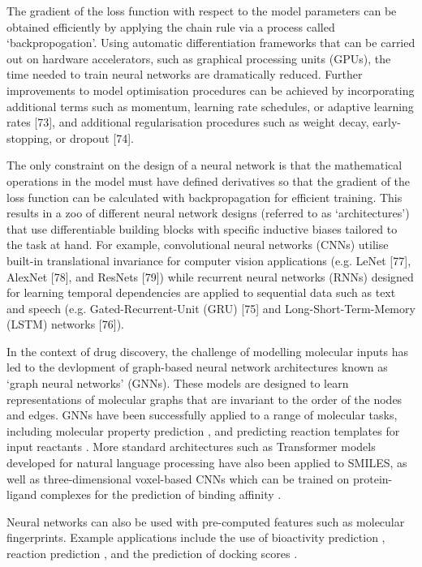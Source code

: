 The gradient of the loss function with respect to the model parameters can be obtained efficiently by applying the chain rule via a process called `backpropogation'. Using automatic differentiation frameworks that can be carried out on hardware accelerators, such as graphical processing units (GPUs), the time needed to train neural networks are dramatically reduced. Further improvements to model optimisation procedures can be achieved by incorporating additional terms such as momentum, learning rate schedules, or adaptive learning rates [73], and additional regularisation procedures such as weight decay, early-stopping, or dropout [74].

The only constraint on the design of a neural network is that the mathematical operations in the model must have defined derivatives so that the gradient of the loss function can be calculated with backpropagation for efficient training. This results in a zoo of different neural network designs (referred to as `architectures') that use differentiable building blocks with specific inductive biases tailored to the task at hand. For example, convolutional neural networks (CNNs) utilise built-in translational invariance for computer vision applications (e.g. LeNet [77], AlexNet [78], and ResNets [79]) while recurrent neural networks (RNNs) designed for learning temporal dependencies are applied to sequential data such as text and speech (e.g. Gated-Recurrent-Unit (GRU) [75] and Long-Short-Term-Memory (LSTM) networks [76]). 

In the context of drug discovery, the challenge of modelling molecular inputs has led to the devlopment of graph-based neural network architectures known as `graph neural networks' (GNNs). These models are designed to learn representations of molecular graphs that are invariant to the order of the nodes and edges. GNNs have been successfully applied to a range of molecular tasks, including molecular property prediction \cite{wu2017molnet}, and predicting reaction templates for input reactants \cite{Coley19WLDN5}. More standard architectures such as Transformer models developed for natural language processing have also been applied to SMILES, as well as three-dimensional voxel-based CNNs which can be trained on protein-ligand complexes for the prediction of binding affinity \cite{Ragoza2017ProteinCNN,Imrie2018ProteinCNN,Jimenez2018Kdeep}.

Neural networks can also be used with pre-computed features such as molecular fingerprints. Example applications include the use of bioactivity prediction \cite{Bender2019}, reaction prediction \cite{Wei2016reactionprediction, segler2017neural}, and the prediction of docking scores \cite{Gentile2020deepdocking}.

